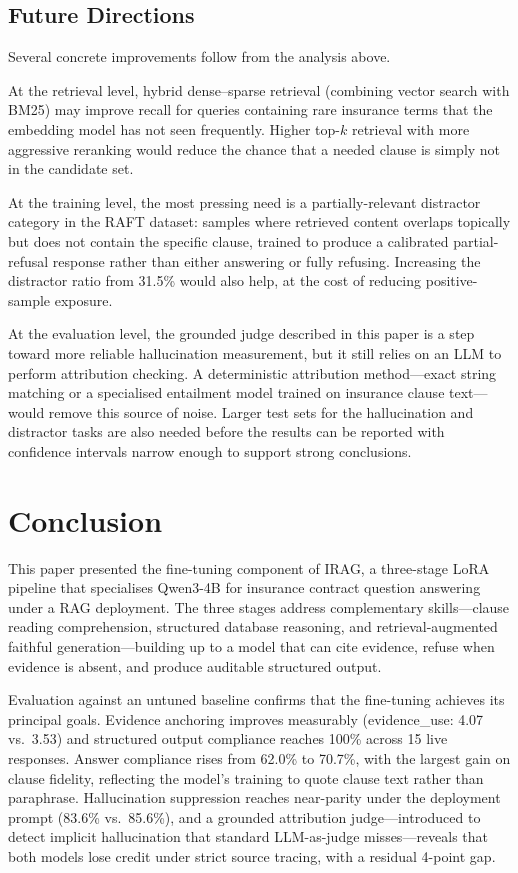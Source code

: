 \documentclass[10pt,conference]{IEEEtran}
\begin{document}
\subsection{Future Directions}

Several concrete improvements follow from the analysis above.

At the retrieval level, hybrid dense--sparse retrieval (combining vector search
with BM25) may improve recall for queries containing rare insurance terms that
the embedding model has not seen frequently.
Higher top-$k$ retrieval with more aggressive reranking would reduce the
chance that a needed clause is simply not in the candidate set.

At the training level, the most pressing need is a partially-relevant
distractor category in the RAFT dataset: samples where retrieved content
overlaps topically but does not contain the specific clause, trained to produce
a calibrated partial-refusal response rather than either answering or fully
refusing.
Increasing the distractor ratio from 31.5\% would also help, at the cost of
reducing positive-sample exposure.

At the evaluation level, the grounded judge described in this paper is a step
toward more reliable hallucination measurement, but it still relies on an LLM
to perform attribution checking.
A deterministic attribution method---exact string matching or a specialised
entailment model trained on insurance clause text---would remove this source of
noise.
Larger test sets for the hallucination and distractor tasks are also needed
before the results can be reported with confidence intervals narrow enough to
support strong conclusions.

\section{Conclusion}
This paper presented the fine-tuning component of IRAG, a three-stage LoRA pipeline that specialises Qwen3-4B for insurance contract question answering under a RAG deployment.
The three stages address complementary skills---clause reading comprehension, structured database reasoning, and retrieval-augmented faithful generation---building up to a model that can cite evidence, refuse when evidence is absent, and produce auditable structured output.

Evaluation against an untuned baseline confirms that the fine-tuning achieves its principal goals.
Evidence anchoring improves measurably (evidence\_use: 4.07 vs.\ 3.53) and structured output compliance reaches 100\% across 15 live responses.
Answer compliance rises from 62.0\% to 70.7\%, with the largest gain on clause fidelity, reflecting the model's training to quote clause text rather than paraphrase.
Hallucination suppression reaches near-parity under the deployment prompt (83.6\% vs.\ 85.6\%), and a grounded attribution judge---introduced to detect implicit hallucination that standard LLM-as-judge misses---reveals that both models lose credit under strict source tracing, with a residual 4-point gap.
\end{document}
